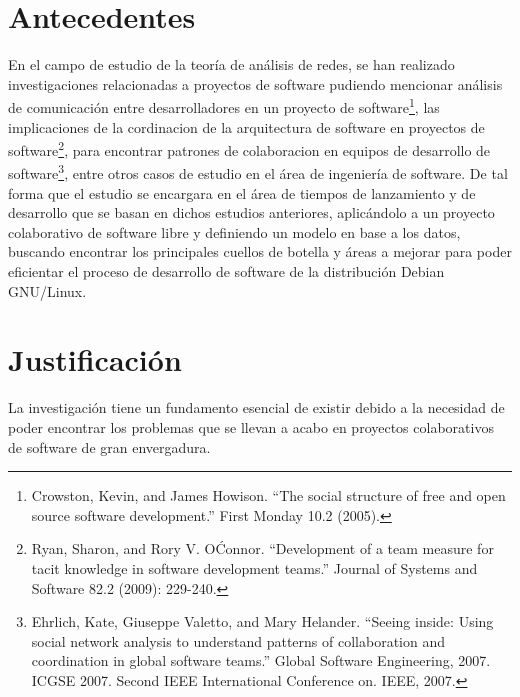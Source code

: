 \documentclass[12pt]{report}
\begin{document}
\chapter*{Antecedentes}  
En  el  campo  de estudio  de  la  teoría  de
análisis  de redes,  se han  realizado investigaciones  relacionadas a
proyectos  de software  pudiendo  mencionar  análisis de  comunicación
entre  desarrolladores en  un proyecto  de software\footnote{Crowston,
Kevin, and  James Howison.   ``The social structure  of free  and open
source  software  development.''   First  Monday  10.2  (2005).},  las
implicaciones  de la  cordinacion de  la arquitectura  de software  en
proyectos    de     software\footnote{Ryan,    Sharon,     and    Rory
V. O\'Connor. ``Development  of a team measure for  tacit knowledge in
software  development teams.''  Journal of  Systems and  Software 82.2
(2009): 229-240.}, para encontrar  patrones de colaboracion en equipos
de  desarrollo de  software\footnote{Ehrlich, Kate,  Giuseppe Valetto,
and Mary Helander.  ``Seeing inside: Using social  network analysis to
understand  patterns  of  collaboration  and  coordination  in  global
software   teams.''   Global   Software   Engineering,   2007.   ICGSE
2007.  Second IEEE  International Conference  on. IEEE,  2007.}, entre
otros casos  de estudio en el  área de ingeniería de  software. De tal
forma que el estudio se encargara en el área de tiempos de lanzamiento
y  de  desarrollo   que  se  basan  en   dichos  estudios  anteriores,
aplicándolo a un proyecto colaborativo  de software libre y definiendo
un  modelo en  base a  los datos,  buscando encontrar  los principales
cuellos de botella y áreas a  mejorar para poder eficientar el proceso
de desarrollo de software de la distribución Debian GNU/Linux.

\chapter*{Justificación} 
La investigación tiene un fundamento esencial
de existir debido a la necesidad  de poder encontrar los problemas que
se  llevan a  acabo en  proyectos  colaborativos de  software de  gran
envergadura.
\end{document}
